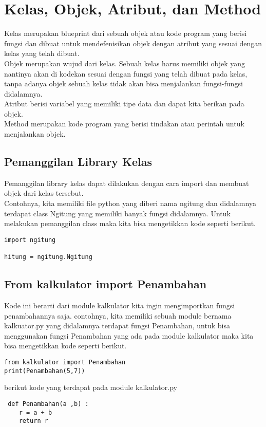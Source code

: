 \section{Kelas, Objek, Atribut, dan Method}
Kelas merupakan blueprint dari sebuah objek atau kode program yang berisi fungsi dan dibuat untuk mendefenisikan objek dengan atribut yang sesuai dengan kelas yang telah dibuat.\\
Objek merupakan wujud dari kelas. Sebuah kelas harus memiliki objek yang nantinya akan di kodekan sesuai dengan fungsi yang telah dibuat pada kelas, tanpa adanya objek sebuah kelas tidak akan bisa menjalankan fungsi-fungsi didalamnya.\\
Atribut berisi variabel yang memiliki tipe data dan dapat kita berikan pada objek.\\
Method merupakan kode program yang berisi tindakan atau perintah untuk menjalankan objek.\\

\subsection{Pemanggilan Library Kelas}
Pemanggilan library kelas dapat dilakukan dengan cara import dan membuat objek dari kelas tersebut.\\
Contohnya, kita memiliki file python yang diberi nama ngitung dan didalamnya terdapat class Ngitung yang memiliki banyak fungsi didalamnya. Untuk melakukan pemanggilan class maka kita bisa mengetikkan kode seperti berikut.
\begin{verbatim}
import ngitung

hitung = ngitung.Ngitung
\end{verbatim}

\subsection{From kalkulator import Penambahan}
Kode ini berarti dari module kalkulator kita ingin mengimportkan fungsi penambahannya saja. contohnya, kita memiliki sebuah module bernama kalkuator.py yang didalamnya terdapat fungsi Penambahan, untuk bisa menggunakan fungsi Penambahan yang ada pada module kalkulator maka kita bisa mengetikkan kode seperti berikut.
\begin{verbatim}
from kalkulator import Penambahan
print(Penambahan(5,7))
\end{verbatim}
berikut kode yang terdapat pada module kalkulator.py
\begin{verbatim}
 def Penambahan(a ,b) : 
 	r = a + b 
 	return r  
\end{verbatim}

